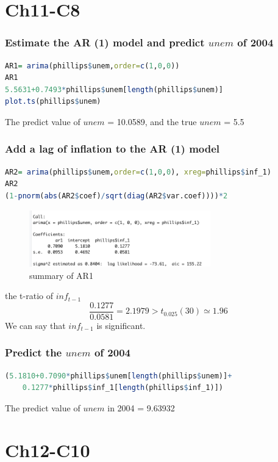 \documentclass[12pt]{article}
\begin{document}
\section*{Ch11-C8}
\subsubsection*{Estimate the AR (1) model and predict $unem$ of 2004}
\begin{lstlisting}[language = R]
AR1= arima(phillips$unem,order=c(1,0,0))
AR1
5.5631+0.7493*phillips$unem[length(phillips$unem)]
plot.ts(phillips$unem)
\end{lstlisting}
The predict value of $unem$ = 10.0589, and the true $unem$ = 5.5

\subsubsection*{Add a lag of inflation to the AR (1) model}
\begin{lstlisting}[language = R]
AR2= arima(phillips$unem,order=c(1,0,0), xreg=phillips$inf_1)
AR2
(1-pnorm(abs(AR2$coef)/sqrt(diag(AR2$var.coef))))*2
\end{lstlisting}
\begin{figure}[H]
    \centering
    \includegraphics*[width = 0.7\textwidth]{AR2.png}
    \caption{summary of AR1}
\end{figure}
the t-ratio of $inf_{t-1}$
\[\frac{0.1277}{0.0581} = 2.1979 > t_{0.025}(30)\simeq 1.96\]
We can say that $inf_{t-1}$ is significant.\\

\subsubsection*{Predict the $unem$ of 2004}
\begin{lstlisting}[language = R]
(5.1810+0.7090*phillips$unem[length(phillips$unem)]+
    0.1277*phillips$inf_1[length(phillips$inf_1)])
\end{lstlisting}
The predict value of $unem$ in 2004 = 9.63932
\newpage

\section*{Ch12-C10}
\end{document}

